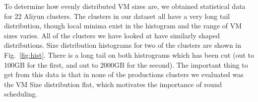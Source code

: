 To determine how evenly distributed VM sizes are, we obtained statistical data
for 22 Aliyun clusters. The clusters in our dataset all have a very long tail
distribution, though local minima exist in the histogram and the range of VM
sizes varies.
All of the clusters we have looked at have similarly shaped distributions. Size
distribution histograms for two of the clusters are shown in
Fig.~\ref{fig:hist}. There is a long tail on both histrograms which has been
cut (out to 100GB for the first, and out to 2000GB for the second). The
important thing to get from this data is that in none of the productions
clusters we evaluated was the VM Size distribution flat, which motivates the
importance of round scheduling.


